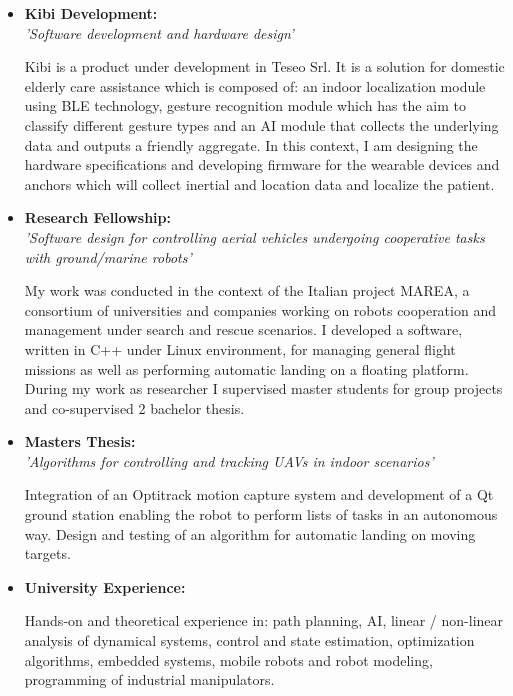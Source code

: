\documentclass[10pt,a4paper,sans]{moderncv}        %
\begin{document}
\begin{itemize}

\vspace{3pt}

\item{\textbf{Kibi Development:} \\\vspace{1pt}\textit{'Software development and hardware design'}

\small{Kibi is a product under development in Teseo Srl. It is a solution for domestic elderly care assistance which is composed of: an indoor localization module using BLE technology, gesture recognition module which has the aim to classify different gesture types and an AI module that collects the underlying data and outputs a friendly aggregate. In this context, I am designing the hardware specifications and developing firmware for the wearable devices and anchors which will collect inertial and location data and localize the patient.}}

\item{\textbf{Research Fellowship:} \\\vspace{1pt}\textit{'Software design for controlling aerial vehicles undergoing cooperative tasks with ground/marine robots'}

\small{ My work was conducted in the context of the Italian project MAREA, a consortium of universities and companies working on robots cooperation and management under search and rescue scenarios. I developed a software, written in C++ under Linux environment, for managing general flight missions as well as performing automatic landing on a floating platform. During my work as researcher I supervised master students for group projects and co-supervised 2 bachelor thesis.}}

\vspace{3pt}

\item{\textbf{Masters Thesis:} \\\vspace{1pt}\textit{'Algorithms for controlling and tracking UAVs in indoor scenarios'}

\small{Integration of an Optitrack motion capture system and development of a Qt ground station enabling the robot to perform lists of tasks in an autonomous way. Design and testing of an algorithm for automatic landing on moving targets.}}

\vspace{6pt}

\item{\textbf{University Experience:}

\vspace{3pt}

\small{Hands-on and theoretical experience in: path planning, AI, linear / non-linear analysis of dynamical systems, control and state estimation, optimization algorithms, embedded systems, mobile robots and robot modeling, programming of industrial manipulators.}}

\end{itemize}
\end{document}
